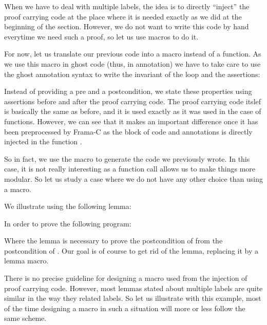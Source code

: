 When we have to deal with multiple labels, the idea is to directly ``inject''
the proof carrying code at the place where it is needed exactly as we did at the
beginning of the section. However, we do not want to write this code by hand
everytime we need such a proof, so let us use macros to do it.



For now, let us translate our previous code into a macro instead of a function.
As we use this macro in ghost code (thus, in annotation) we have to take care to
use the ghost annotation syntax to write the invariant of the loop and the
assertions:






Instead of providing a pre and a postcondition, we state these properties using
assertions before and after the proof carrying code. The proof carrying code
itslef is basically the same as before, and it is used exactly as it was used in
the case of functions. However, we can see that it makes an important difference
once it has been preprocessed by Frama-C as the block of code and annotations is
directly injected in the function .






So in fact, we use the macro to generate the code we previously wrote. In this
case, it is not really interesting as a function call allows us to make things
more modular. So let us study a case where we do not have any other choice than
using a macro.



We illustrate using the following lemma:





In order to prove the following program:




Where the lemma  is necessary to prove the postcondition
of  from the postcondition of . Our
goal is of course to get rid of the lemma, replacing it by a lemma macro.



There is no precise guideline for designing a macro used from the injection of
proof carrying code. However, most lemmas stated about multiple labels are quite
similar in the way they related labels. So let us illustrate with this example,
most of the time designing a macro in such a situation will more or less follow
the same scheme.



